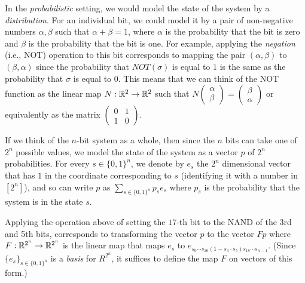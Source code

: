 In the \emph{probabilistic} setting, we would model the state of the
system by a \emph{distribution}. For an individual bit, we could model
it by a pair of non-negative numbers \(\alpha,\beta\) such that
\(\alpha+\beta=1\), where \(\alpha\) is the probability that the bit is
zero and \(\beta\) is the probability that the bit is one. For example,
applying the \emph{negation} (i.e., NOT) operation to this bit
corresponds to mapping the pair \((\alpha,\beta)\) to \((\beta,\alpha)\)
since the probability that \(\ensuremath{\mathit{NOT}}(\sigma)\) is
equal to \(1\) is the same as the probability that \(\sigma\) is equal
to \(0\). This means that we can think of the NOT function as the linear
map \(N:{\mathbb{R}}^2 \rightarrow {\mathbb{R}}^2\) such that
\(N \begin{pmatrix} \alpha \\ \beta \end{pmatrix} = \begin{pmatrix} \beta \\ \alpha \end{pmatrix}\)
or equivalently as the matrix
\(\begin{pmatrix} 0 & 1 \\ 1 & 0 \end{pmatrix}\).

If we think of the \(n\)-bit system as a whole, then since the \(n\)
bits can take one of \(2^n\) possible values, we model the state of the
system as a vector \(p\) of \(2^n\) probabilities. For every
\(s\in \{0,1\}^n\), we denote by \(e_s\) the \(2^n\) dimensional vector
that has \(1\) in the coordinate corresponding to \(s\) (identifying it
with a number in \([2^n]\)), and so can write \(p\) as
\(\sum_{s\in \{0,1\}^n} p_s e_s\) where \(p_s\) is the probability that
the system is in the state \(s\).

Applying the operation above of setting the \(17\)-th bit to the NAND of
the 3rd and 5th bits, corresponds to transforming the vector \(p\) to
the vector \(Fp\) where \(F:{\mathbb{R}}^{2^n} \rightarrow {\mathbb{R}}^{2^n}\) is the
linear map that maps \(e_s\) to
\(e_{s_0\cdots s_{16}(1-s_3\cdot s_5)s_{18}\cdots s_{n-1}}\). (Since
\(\{ e_s \}_{s\in \{0,1\}^n}\) is a \emph{basis} for \(R^{2^n}\), it
suffices to define the map \(F\) on vectors of this form.)


